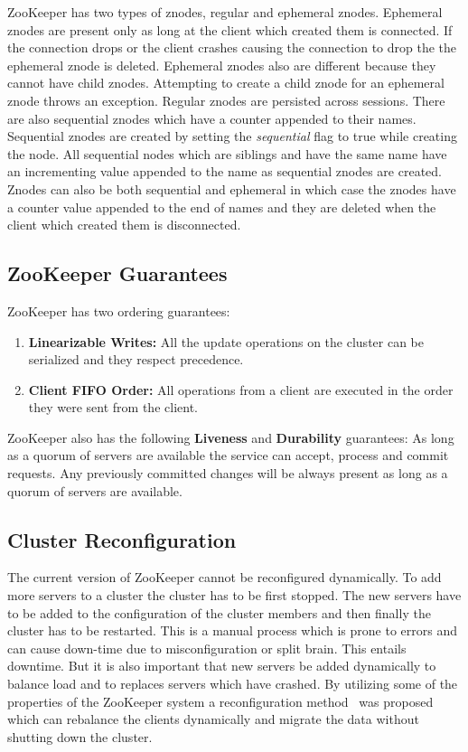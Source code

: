 \vspace{1.5em}

\vspace{1.5em}

ZooKeeper has two types of znodes, regular and ephemeral znodes. Ephemeral znodes are present only as long at the client which created them is connected. If the connection drops or the client crashes causing the connection to drop the the ephemeral znode is deleted. Ephemeral znodes also are different because they cannot have child znodes. Attempting to create a child znode for an ephemeral znode throws an exception. Regular znodes are persisted across sessions. There are also sequential znodes which have a counter appended to their names. Sequential znodes are created by setting the \textit{sequential} flag to true while creating the node. All sequential nodes which are siblings and have the same name have an incrementing value appended to the name as sequential znodes are created. Znodes can also be both sequential and ephemeral in which case the znodes have a counter value appended to the end of names and they are deleted when the client which created them is disconnected.

\subsection{ZooKeeper Guarantees}
ZooKeeper has two ordering guarantees:
\begin{enumerate}
	\item \textbf{Linearizable Writes:} All the update operations on the cluster can be serialized and they respect precedence.
	\item \textbf{Client FIFO Order:} All operations from a client are executed in the order they were sent from the client.
\end{enumerate}
ZooKeeper also has the following \textbf{Liveness} and \textbf{Durability} guarantees: As long as a quorum of servers are available the service can accept, process and commit requests. Any previously committed changes will be always present as long as a quorum of servers are available.

\subsection{Cluster Reconfiguration}
	The current version of ZooKeeper cannot be reconfigured dynamically. To add more servers to a cluster the cluster has to be first stopped. The new servers have to be added to the configuration of the cluster members and then finally the cluster has to be restarted. This is a manual process which is prone to errors and can cause down-time due to misconfiguration or split brain. This entails downtime. But it is also important that new servers be added dynamically to balance load and to replaces servers which have crashed. By utilizing some of the properties of the ZooKeeper system a reconfiguration method~\cite{shraer2012dynamic} was proposed which can rebalance the clients dynamically and migrate the data without shutting down the cluster.

